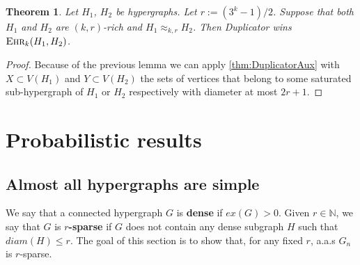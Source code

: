 \documentclass[12pt,notitlepage,a4paper]{article}
\newtheorem{theorem}{Theorem}[section]
\theoremstyle{definition}
\newcommand{\N}{\mathbb{N}}
\newcommand{\ehr}{\textsc{Ehr}}
\begin{document}
\begin{theorem}\label{thm:Duplicatorwins}
	Let $H_1$, $H_2$ be hypergraphs. Let $r:=(3^k-1)/2$. Suppose
	that both $H_1$ and $H_2$ are $(k,r)$-rich and
	$H_1\approx_{k,r} H_2$. Then Duplicator wins $\ehr_{k}(H_1,H_2)$.
\end{theorem}
	\begin{proof}
		Because of the previous lemma we can apply 
		\cref{thm:DuplicatorAux} with $X\subset V(H_1)$ 
		and	$Y\subset V(H_2)$ the sets of vertices that belong
		to some saturated sub-hypergraph of $H_1$ or $H_2$ respectively
		with diameter at most $2r+1$.
	\end{proof}


\section{Probabilistic results}



\subsection{Almost all hypergraphs are simple}


We say that a connected hypergraph $G$ is \textbf{dense} if
$ex(G)>0$. Given $r\in \N$, we say that $G$ is \textbf{$r$-sparse}
if $G$ does not contain any dense subgraph $H$ such that 
$diam(H)\leq r$. The goal of this section is to show that, for any
fixed $r$, a.a.s $G_n$ is $r$-sparse.\par
\end{document}
